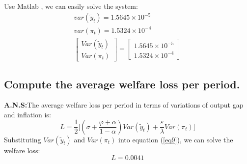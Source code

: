 \documentclass[12pt]{article}
\begin{document}
Use Matlab , we can easily solve the system:
\begin{gather*}
 var(\tilde{y}_{t}) =  1.5645\times 10^{-5} \\
 var( \pi_{t}) =1.5324\times 10^{-4}\\
\left[
\begin{array}{c}
Var(\tilde{y}_{t}) \\
 Var( \pi_{t})
\end{array}
\right] = \left[
\begin{array}{c}
 1.5645\times 10^{-5} \\
1.5324\times 10^{-4}
\end{array}
\right]
  \end{gather*}
\newpage
\subsection{Compute the average welfare loss per period.} %
\textbf{A.N.S:}The average welfare loss per period in terms of variations of output gap and inflation is:
\begin{equation}
L = \frac{1}{2}\big[ (\sigma+\frac{\varphi+\alpha}{1-\alpha})Var(\tilde{y}_{t})+\frac{\varepsilon}{\lambda} Var( \pi_{t})\big]\label{eq9}
\end{equation}
Substituting $Var(\tilde{y}_{t})$ and $Var( \pi_{t})$ into  equation (\ref{eq9}), we can solve the welfare loss:
\begin{equation*}
L = 0.0041
\end{equation*}
\end{document}
